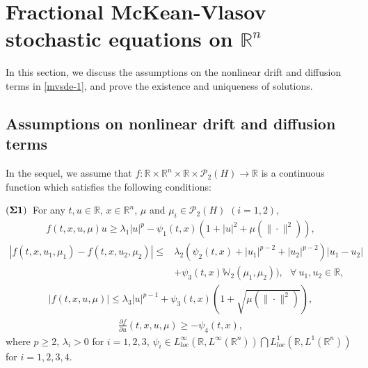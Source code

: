 \documentclass[11pt]{article}
\numberwithin{equation}{section}
\theoremstyle{plain}
\def\geq{\geqslant}
\def\leq{\leqslant}
\begin{document}
\section{Fractional McKean-Vlasov stochastic  equations on $\mathbb{R}^n$}

 In this section,
 we discuss the assumptions on the nonlinear drift and diffusion terms in \eqref{mvsde-1},
 and prove the existence and uniqueness of solutions.


\subsection{Assumptions on nonlinear drift and diffusion terms}

 In the sequel,
 we assume that
    $f: {\mathbb{R}} \times {\mathbb{R}}^n \times {\mathbb{R}} \times \mathcal{P}_2(H) \to {\mathbb{R}}$
 is a continuous function which satisfies the following conditions:

  \noindent
 $({\bf \Sigma 1})$\
  For any $t, u \in \mathbb{R}$,
          $x \in \mathbb{R}^n$,
          $\mu$ and $\mu_i \in \mathcal{P}_2(H)$ $(i=1,2)$,
\begin{align}\label{f-1}
   f(t,x,u,\mu) u \geq \lambda_1 |u|^p - \psi_1(t,x)(1 + |u|^2
   + \mu( \|\cdot\|^2) ),
\end{align}
\begin{align}\label{f-2}
   | f(t,x,u_1, \mu_1) - f(t,x,u_2, \mu_2) |
   \leq & \lambda_2 \left( \psi_2(t,x) + |u_1|^{p-2} + |u_2|^{p-2} \right) |u_1 - u_2|  \nonumber \\
        & + \psi_3(t,x) \mathbb{W}_2 (\mu_1, \mu_2) ),
          \ \ \
                \forall \  u_1, u_2 \in \mathbb{R},
\end{align}
\begin{align}\label{f-3}
   | f(t,x,u, \mu) |
   \leq \lambda_3 |u|^{p-1} + \psi_3(t,x) \left( 1 + \sqrt{ \mu( \|\cdot\|^2) } \right),
\end{align}
\begin{align}\label{f-4}
   \frac{\partial f}{\partial u}
    (t,x,u,\mu)
   \geq - \psi_4(t,x),
\end{align}
 where
 $p\ge 2$,  $\lambda_i >0$
 for  $i=1,2,3$,
       $\psi_i \in
        L_{loc}^\infty( \mathbb{R},
        L^\infty(\mathbb{R}^n) )
                   \bigcap
                   L_{loc}^1( \mathbb{R}, L^1(\mathbb{R}^n) )$
                   for
       $i = 1, 2,3,4$.
\end{document}
